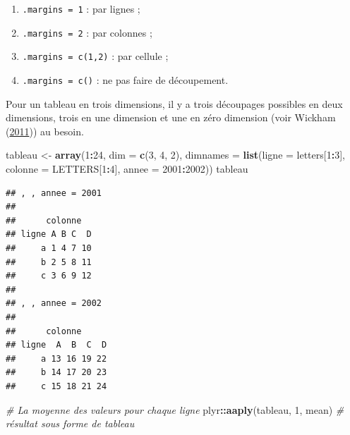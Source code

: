 \documentclass[
  11pt,
]{book}
\newenvironment{Shaded}{\begin{snugshade}}{\end{snugshade}}
\newcommand{\CommentTok}[1]{\textcolor[rgb]{0.56,0.35,0.01}{\textit{#1}}}
\newcommand{\DataTypeTok}[1]{\textcolor[rgb]{0.13,0.29,0.53}{#1}}
\newcommand{\DecValTok}[1]{\textcolor[rgb]{0.00,0.00,0.81}{#1}}
\newcommand{\KeywordTok}[1]{\textcolor[rgb]{0.13,0.29,0.53}{\textbf{#1}}}
\newcommand{\NormalTok}[1]{#1}
\newcommand{\OperatorTok}[1]{\textcolor[rgb]{0.81,0.36,0.00}{\textbf{#1}}}
\newcommand{\StringTok}[1]{\textcolor[rgb]{0.31,0.60,0.02}{#1}}
\providecommand{\tightlist}{%
  \setlength{\itemsep}{0pt}\setlength{\parskip}{0pt}}
\numberwithin{equation}{section}
\numberwithin{countremarque}{section}
\begin{document}
\begin{enumerate}
\def\labelenumi{\arabic{enumi}.}
\tightlist
\item
  \texttt{.margins\ =\ 1} : par lignes ;
\item
  \texttt{.margins\ =\ 2} : par colonnes ;
\item
  \texttt{.margins\ =\ c(1,2)} : par cellule ;
\item
  \texttt{.margins\ =\ c()} : ne pas faire de découpement.
\end{enumerate}

Pour un tableau en trois dimensions, il y a trois découpages possibles en deux dimensions, trois en une dimension et une en zéro dimension (voir Wickham (\protect\hyperlink{ref-Wickham_2011_Split}{2011})) au besoin.

\begin{Shaded}
\begin{Highlighting}[]
\NormalTok{tableau \textless{}{-}}\StringTok{ }\KeywordTok{array}\NormalTok{(}\DecValTok{1}\OperatorTok{:}\DecValTok{24}\NormalTok{, }\DataTypeTok{dim =} \KeywordTok{c}\NormalTok{(}\DecValTok{3}\NormalTok{, }\DecValTok{4}\NormalTok{, }\DecValTok{2}\NormalTok{),}
                 \DataTypeTok{dimnames =} \KeywordTok{list}\NormalTok{(}\DataTypeTok{ligne =}\NormalTok{ letters[}\DecValTok{1}\OperatorTok{:}\DecValTok{3}\NormalTok{],}
                                 \DataTypeTok{colonne =}\NormalTok{ LETTERS[}\DecValTok{1}\OperatorTok{:}\DecValTok{4}\NormalTok{],}
                                 \DataTypeTok{annee =} \DecValTok{2001}\OperatorTok{:}\DecValTok{2002}\NormalTok{))}
\NormalTok{tableau}
\end{Highlighting}
\end{Shaded}

\begin{lstlisting}
## , , annee = 2001
## 
##      colonne
## ligne A B C  D
##     a 1 4 7 10
##     b 2 5 8 11
##     c 3 6 9 12
## 
## , , annee = 2002
## 
##      colonne
## ligne  A  B  C  D
##     a 13 16 19 22
##     b 14 17 20 23
##     c 15 18 21 24
\end{lstlisting}

\begin{Shaded}
\begin{Highlighting}[]
\CommentTok{\# La moyenne des valeurs pour chaque ligne}
\NormalTok{plyr}\OperatorTok{::}\KeywordTok{aaply}\NormalTok{(tableau, }\DecValTok{1}\NormalTok{, mean) }\CommentTok{\# résultat sous forme de tableau}
\end{Highlighting}
\end{Shaded}
\end{document}

